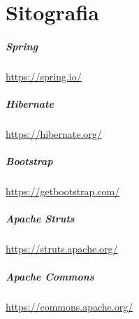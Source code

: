 \cleardoublepage
\chapter{Sitografia}
\label{cap:sitografia}
\nocite{*}

\printbibliography[heading=subbibliography,title={Riferimenti bibliografici},type=book]

\printbibliography[heading=subbibliography,title={Siti web consultati},type=online]

\paragraph*{Spring} \url{https://spring.io/}
\label{para:spring-site}

\paragraph*{Hibernate} \url{https://hibernate.org/}
\label{para:hibernate-site}

\paragraph*{Bootstrap} \url{https://getbootstrap.com/}
\label{para:bootstrap-site}

\paragraph*{Apache Struts} \url{https://struts.apache.org/}
\label{para:struts-site}

\paragraph*{Apache Commons} \url{https://commons.apache.org/}
\label{para:commons-site}